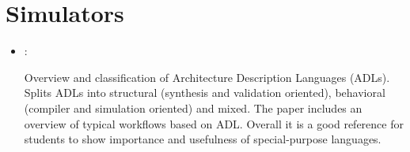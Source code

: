 \section*{Simulators}
\begin{itemize}
    \item \cite{Mishra:ADL:2005}:

    Overview and classification of Architecture Description Languages (ADLs). Splits ADLs into structural (synthesis and validation oriented), behavioral (compiler and simulation oriented) and mixed. The paper includes an overview of typical workflows based on ADL. Overall it is a good reference for students to show importance and usefulness of special-purpose languages.
\end{itemize}


